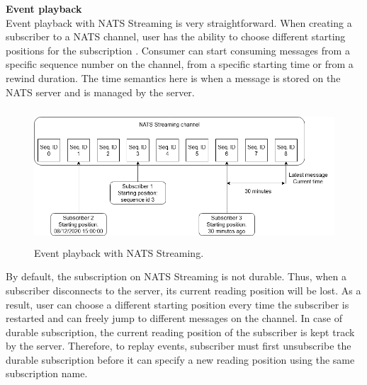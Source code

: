 \textbf{Event playback}\\
Event playback with NATS Streaming is very straightforward. When creating a subscriber to a NATS channel, user has the ability to choose different starting positions for the subscription \cite{natseventplayback}. Consumer can start consuming messages from a specific sequence number on the channel, from a specific starting time or from a rewind duration. The time semantics here is when a message is stored on the NATS server and is managed by the server.
\begin{figure}[h]
	\centering
	\includegraphics[width=\linewidth,height=5cm]{images/event-playback-nats.png}
	\caption{Event playback with NATS Streaming.}
	\label{fig:natseventplayback}
\end{figure}

By default, the subscription on NATS Streaming is not durable. Thus, when a subscriber disconnects to the server, its current reading position will be lost. As a result, user can choose a different starting position every time the subscriber is restarted and can freely jump to different messages on the channel. In case of durable subscription, the current reading position of the subscriber is kept track by the server. Therefore, to replay events, subscriber must first unsubscribe the durable subscription before it can specify a new reading position using the same subscription name.







